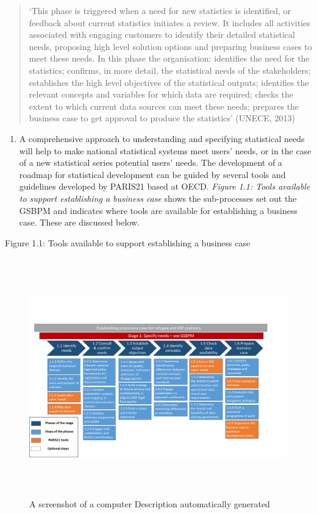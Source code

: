 \documentclass[
]{article}
\providecommand{\tightlist}{%
  \setlength{\itemsep}{0pt}\setlength{\parskip}{0pt}}
\begin{document}
\begin{quote}
`This phase is triggered when a need for new statistics is identified,
or feedback about current statistics initiates a review. It includes
all activities associated with engaging customers to identify their
detailed statistical needs, proposing high level solution options and
preparing business cases to meet these needs. In this phase the
organisation: identifies the need for the statistics; confirms, in
more detail, the statistical needs of the stakeholders; establishes
the high level objectives of the statistical outputs; identifies the
relevant concepts and variables for which data are required; checks
the extent to which current data sources can meet these needs;
prepares the business case to get approval to produce the statistics'
(UNECE, 2013)
\end{quote}

\begin{enumerate}
\def\labelenumi{\arabic{enumi}.}
\setcounter{enumi}{21}
\tightlist
\item
  A comprehensive approach to understanding and specifying statistical
  needs will help to make national statistical systems meet users'
  needs, or in the case of a new statistical series potential users'
  needs. The development of a roadmap for statistical development can
  be guided by several tools and guidelines developed by PARIS21 based
  at OECD. \emph{Figure 1.1: Tools available to support establishing a
  business case} shows the sub-processes set out the GSBPM and
  indicates where tools are available for establishing a business
  case. These are discussed below.
\end{enumerate}

Figure 1.1: Tools available to support establishing a business case

\begin{figure}
\centering
\includegraphics[width=6.5in,height=4.06597in]{media/image1.png}
\caption{A screenshot of a computer Description automatically
generated}
\end{figure}
\end{document}

